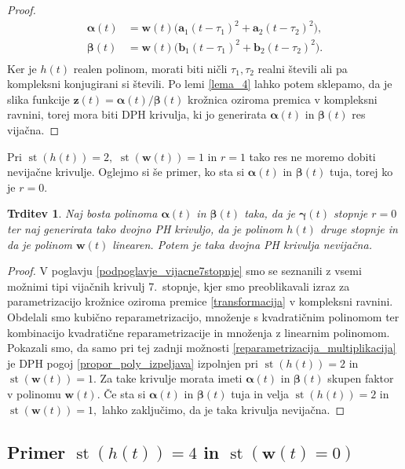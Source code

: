 \documentclass[12pt,a4paper,twoside]{article}
\theoremstyle{definition} %
\theoremstyle{plain} %
\newtheorem{trditev}[definicija]{Trditev}
\numberwithin{equation}{section}  %
\newcommand{\aV}{\mathbf{a}}
\newcommand{\bV}{\mathbf{b}}
\newcommand{\wV}{\mathbf{w}}
\newcommand{\zV}{\mathbf{z}}
\newcommand{\balpha}{\boldsymbol \alpha}
\newcommand{\bbeta}{\boldsymbol \beta}
\newcommand{\bgamma}{\boldsymbol \gamma}
\DeclareMathOperator{\st}{st}
\begin{document}
\begin{proof}
	\begin{align*}
		\balpha(t)&=\wV(t)\big(\aV_1(t-\tau_1)^2+\aV_2(t-\tau_2)^2\big),\\
		\bbeta(t)&=\wV(t)\big(\bV_1(t-\tau_1)^2+\bV_2(t-\tau_2)^2\big).\\
	\end{align*}
	Ker je $h(t)$ realen polinom, morati biti ničli $\tau_1,\tau_2$ realni števili ali pa kompleksni konjugirani si števili. Po lemi \ref{lema_4} lahko potem sklepamo, da je slika funkcije $\zV(t)=\balpha(t)/\bbeta(t)$ krožnica oziroma premica v kompleksni ravnini, torej mora biti DPH krivulja, ki jo generirata $\balpha(t)$ in $\bbeta(t)$ res vijačna.
\end{proof}
Pri $\st(h(t))=2,$ $\st(\wV(t))=1$ in $r=1$ tako res ne moremo dobiti nevijačne krivulje. Oglejmo si še primer, ko sta si $\balpha(t)$ in $\bbeta(t)$ tuja, torej ko je $r=0.$
\begin{trditev}
	Naj bosta polinoma $\balpha(t)$ in $\bbeta(t)$ taka, da je $\bgamma(t)$ stopnje $r=0$ ter naj generirata tako dvojno PH krivuljo, da je polinom $h(t)$ druge stopnje in da je polinom $\wV(t)$ linearen. Potem je taka dvojna PH krivulja nevijačna.
\end{trditev}
\begin{proof}
	V poglavju \ref{podpoglavje_vijacne7stopnje} smo se seznanili z vsemi možnimi tipi vijačnih krivulj 7.\ stopnje, kjer smo preoblikavali izraz za parametrizacijo krožnice oziroma premice \eqref{transformacija} v kompleksni ravnini. Obdelali smo kubično reparametrizacijo, množenje s kvadratičnim polinomom ter kombinacijo kvadratične reparametrizacije in množenja z linearnim polinomom. Pokazali smo, da samo pri tej zadnji možnosti \ref{reparametrizacija_multiplikacija} je DPH pogoj \eqref{propor_poly_izpeljava} izpolnjen pri $\st(h(t))=2$ in $\st(\wV(t))=1.$ Za take krivulje morata imeti $\balpha(t)$ in $\bbeta(t)$ skupen faktor v polinomu $\wV(t).$ Če sta si $\balpha(t)$ in $\bbeta(t)$ tuja in velja $\st(h(t))=2$ in $\st(\wV(t))=1,$ lahko zaključimo, da je taka krivulja nevijačna.
\end{proof}

\subsection{Primer \texorpdfstring{$\st(h(t))=4$}{st(h(t))=4} in \texorpdfstring{$\st(\wV(t)=0)$}{st(w(t))=0}}
\label{locevanje_h4w0}
\end{document}
